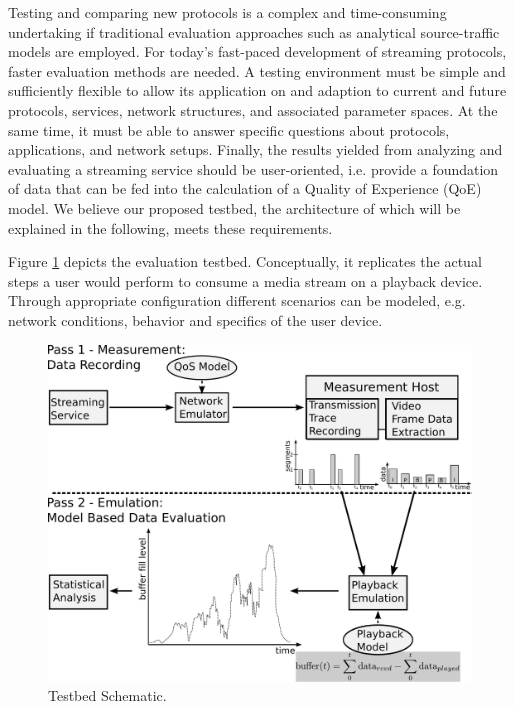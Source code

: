 Testing and comparing new protocols is a complex and time-consuming undertaking if traditional evaluation approaches such as analytical source-traffic models are employed. For today's fast-paced development of streaming protocols, faster evaluation methods are needed. A testing environment must be simple and sufficiently flexible to allow its application on and adaption to current and future protocols, services, network structures, and associated parameter spaces. 
At the same time, it must be able to answer specific questions about  protocols, applications, and network setups. Finally, the results yielded from analyzing and evaluating a streaming service should be user-oriented, i.e. provide a foundation of data that can be fed into the calculation of a Quality of Experience (QoE) model. We believe our proposed testbed, the architecture of which will be explained in the following, meets these requirements.



Figure \ref{c3:fig:testbed} depicts the evaluation testbed. %
Conceptually, it replicates the actual steps a user would perform to consume a media stream on a playback device. Through appropriate configuration different scenarios can be modeled, e.g. network conditions, behavior and specifics of the user device.
 
 
\begin{figure}[htbp]
	\includegraphics[width=\textwidth]{images/measurement-model.pdf}
	\caption{Testbed Schematic.}
	\label{c3:fig:testbed}
\end{figure}

